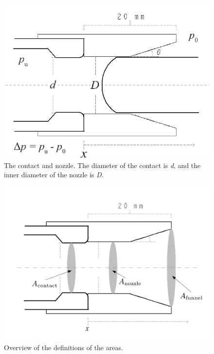 \documentclass[10pt,a4paper,twoside]{article}
\begin{document}
\begin{figure} [h]
\centering
\includegraphics[scale=0.45]{Bilder/Method/ContactAndNozzleFunnelShape5.png}
\caption{The contact and nozzle. The diameter of the contact is \textit{d}, and the inner diameter of the nozzle is \textit{D}.} \label{fig:contactAndNozzle}
\end{figure}

\begin{figure} [H] %
\centering
\includegraphics[scale=0.35]{Bilder/Method/AreaDef.png}
\caption{Overview of the definitions of the areas.} \label{fig:AreacontactAndNozzle}
\end{figure}
\end{document}
